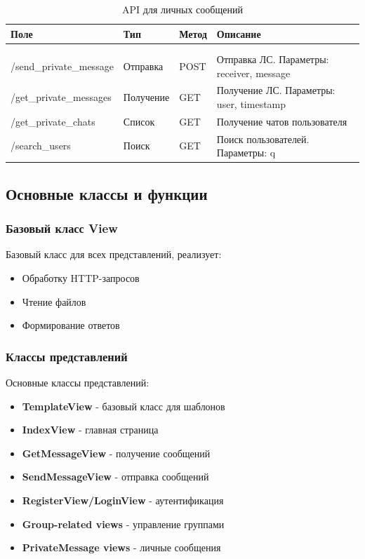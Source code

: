 \begin{xltabular}{\textwidth}{|l|l|p{1.7cm}|X|}
	\caption{API для личных сообщений}\label{tab:private_api} \\ \hline
	\centrow Поле & \centrow Тип & \centrow Метод & \centrow Описание \\ \hline
	 &  &  &  \\ \hline
	\endfirsthead
	 &  &  &  \\ \hline
	\finishhead
	/send\_private\_message & Отправка & POST & Отправка ЛС. Параметры: receiver, message \\ \hline 
	/get\_private\_messages & Получение & GET & Получение ЛС. Параметры: user, timestamp \\ \hline 
	/get\_private\_chats & Список & GET & Получение чатов пользователя \\ \hline 
	/search\_users & Поиск & GET & Поиск пользователей. Параметры: q \\ \hline 
\end{xltabular}

\subsection{Основные классы и функции}

\subsubsection{Базовый класс View}

Базовый класс для всех представлений, реализует:
\begin{itemize}
	\item Обработку HTTP-запросов
	\item Чтение файлов
	\item Формирование ответов
\end{itemize}

\subsubsection{Классы представлений}

Основные классы представлений:
\begin{itemize}
	\item \textbf{TemplateView} - базовый класс для шаблонов
	\item \textbf{IndexView} - главная страница
	\item \textbf{GetMessageView} - получение сообщений
	\item \textbf{SendMessageView} - отправка сообщений
	\item \textbf{RegisterView/LoginView} - аутентификация
	\item \textbf{Group-related views} - управление группами
	\item \textbf{PrivateMessage views} - личные сообщения
\end{itemize}

